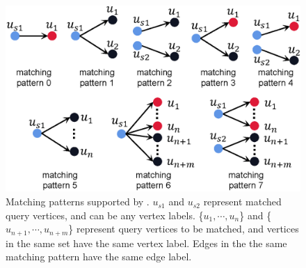 
\begin{figure}
\centering
\includegraphics[width=0.9\columnwidth]{./figure/extpattern.eps}
\caption{Matching patterns supported by \SystemName. $u_{s1}$ and $u_{s2}$ represent matched query vertices, and can be any vertex labels. \{$u_1, \cdots, u_{n}$\} and
\{$u_{n+1}, \cdots, u_{n+m}$\} represent query vertices to be matched, and vertices in the same set have the same vertex label. Edges in the the same matching pattern have the same edge label.}
\label{fig:matchpattern}
\end{figure}


